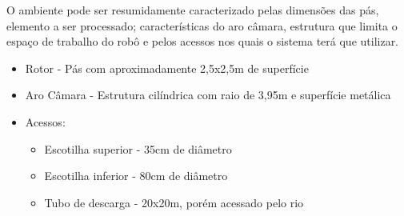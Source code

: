 O ambiente pode ser resumidamente caracterizado pelas dimensões das pás,
elemento a ser processado; características do aro câmara, estrutura que limita o
espaço de trabalho do robô e pelos acessos nos quais o sistema terá que
utilizar.

\begin{itemize}
  \item Rotor - Pás com aproximadamente 2,5x2,5m de superfície
  \item Aro Câmara - Estrutura cilíndrica com raio de 3,95m e superfície
  metálica
  \item Acessos: 
  	\begin{itemize}
    	\item Escotilha superior - 35cm de diâmetro
  		\item Escotilha inferior - 80cm de diâmetro
  		\item Tubo de descarga - 20x20m, porém acessado pelo rio 
  	\end{itemize}
\end{itemize}






